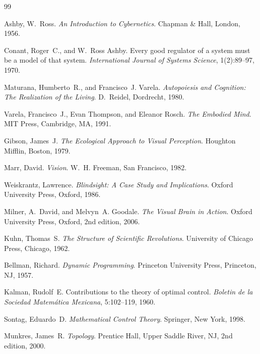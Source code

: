 \documentclass[12pt, oneside]{article}
\theoremstyle{plain}
\theoremstyle{definition}
\theoremstyle{remark}
\theoremstyle{definition}
\begin{document}
\begin{thebibliography}{99}

Ashby, W.~Ross.
\newblock \emph{An Introduction to Cybernetics}.
\newblock Chapman \& Hall, London, 1956.

Conant, Roger~C., and W.~Ross Ashby.
\newblock Every good regulator of a system must be a model of that system.
\newblock \emph{International Journal of Systems Science}, 1(2):89--97, 1970.

Maturana, Humberto~R., and Francisco~J. Varela.
\newblock \emph{Autopoiesis and Cognition: The Realization of the Living}.
\newblock D.~Reidel, Dordrecht, 1980.

Varela, Francisco~J., Evan Thompson, and Eleanor Rosch.
\newblock \emph{The Embodied Mind}.
\newblock MIT Press, Cambridge, MA, 1991.

Gibson, James~J.
\newblock \emph{The Ecological Approach to Visual Perception}.
\newblock Houghton Mifflin, Boston, 1979.

Marr, David.
\newblock \emph{Vision}.
\newblock W.~H. Freeman, San Francisco, 1982.

Weiskrantz, Lawrence.
\newblock \emph{Blindsight: A Case Study and Implications}.
\newblock Oxford University Press, Oxford, 1986.

Milner, A.~David, and Melvyn~A. Goodale.
\newblock \emph{The Visual Brain in Action}.
\newblock Oxford University Press, Oxford, 2nd edition, 2006.

Kuhn, Thomas~S.
\newblock \emph{The Structure of Scientific Revolutions}.
\newblock University of Chicago Press, Chicago, 1962.

Bellman, Richard.
\newblock \emph{Dynamic Programming}.
\newblock Princeton University Press, Princeton, NJ, 1957.

Kalman, Rudolf~E.
\newblock Contributions to the theory of optimal control.
\newblock \emph{Boletin de la Sociedad Matem\'atica Mexicana},
  5:102--119, 1960.

Sontag, Eduardo~D.
\newblock \emph{Mathematical Control Theory}.
\newblock Springer, New York, 1998.

Munkres, James~R.
\newblock \emph{Topology}.
\newblock Prentice Hall, Upper Saddle River, NJ, 2nd edition, 2000.


\end{thebibliography}
\end{document}
